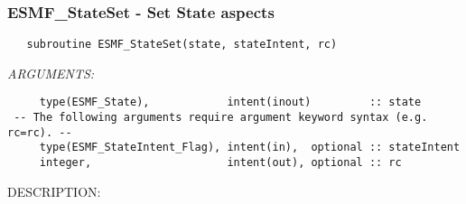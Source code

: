  
\setlength{\oldparskip}{\parskip}
\setlength{\parskip}{1.5ex}
\setlength{\oldparindent}{\parindent}
\setlength{\parindent}{0pt}
\setlength{\oldbaselineskip}{\baselineskip}
\setlength{\baselineskip}{11pt}
 
\def\bv{\begin{verbatim}}
\def\ev{\end{verbatim}}
\def\be{\begin{equation}}
\def\ee{\end{equation}}
\def\bea{\begin{eqnarray}}
\def\eea{\end{eqnarray}}
\def\bi{\begin{itemize}}
\def\ei{\end{itemize}}
\def\bn{\begin{enumerate}}
\def\en{\end{enumerate}}
\def\bd{\begin{description}}
\def\ed{\end{description}}
\def\({\left (}
\def\){\right )}
\def\[{\left [}
\def\]{\right ]}
\def\<{\left  \langle}
\def\>{\right \rangle}
\def\cI{{\cal I}}
\def\diag{\mathop{\rm diag}}
\def\tr{\mathop{\rm tr}}


 
\subsubsection [ESMF\_StateSet] {ESMF\_StateSet - Set State aspects}


  
\begin{verbatim}   subroutine ESMF_StateSet(state, stateIntent, rc)\end{verbatim}{\em ARGUMENTS:}
\begin{verbatim}     type(ESMF_State),            intent(inout)         :: state
 -- The following arguments require argument keyword syntax (e.g. rc=rc). --
     type(ESMF_StateIntent_Flag), intent(in),  optional :: stateIntent
     integer,                     intent(out), optional :: rc             
 \end{verbatim}
{\sf DESCRIPTION:\\ }


